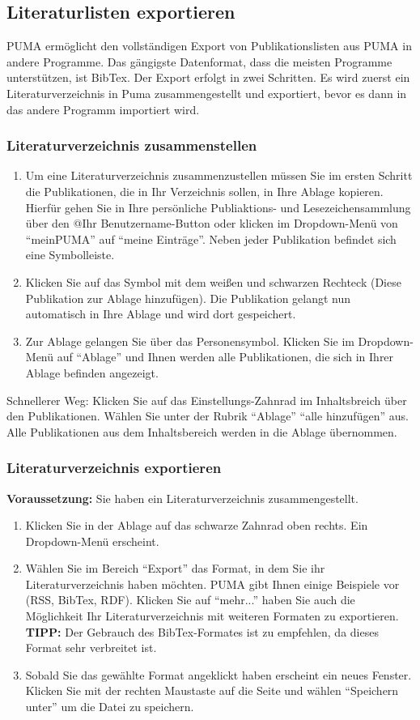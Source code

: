 \documentclass[b5paper,11pt,twoside]{scrbook} %
\begin{document}
\subsection{Literaturlisten exportieren}
PUMA ermöglicht den vollständigen Export von Publikationslisten aus PUMA in andere Programme. Das gängigste Datenformat, dass die meisten Programme unterstützen, ist BibTex. \newline 
Der Export erfolgt in zwei Schritten. Es wird zuerst ein Literaturverzeichnis in Puma zusammengestellt und exportiert, bevor es dann in das andere Programm importiert wird.
\subsubsection{Literaturverzeichnis zusammenstellen}
\begin{enumerate}
    \item Um eine Literaturverzeichnis zusammenzustellen müssen Sie im ersten Schritt die Publikationen, die in Ihr Verzeichnis sollen, in Ihre Ablage kopieren. Hierfür gehen Sie in Ihre persönliche Publiaktions- und Lesezeichensammlung über den @Ihr Benutzername-Button oder klicken im Dropdown-Menü von \enquote{meinPUMA} auf \enquote{meine Einträge}.  Neben jeder Publikation befindet sich eine Symbolleiste.
    \item Klicken Sie auf das Symbol mit dem weißen und schwarzen Rechteck (Diese Publikation zur Ablage hinzufügen). Die Publikation gelangt nun automatisch in Ihre Ablage und wird dort gespeichert.
    \item Zur Ablage gelangen Sie über das Personensymbol. Klicken Sie im Dropdown-Menü auf \enquote{Ablage} und Ihnen werden alle Publikationen, die sich in Ihrer Ablage befinden angezeigt. 
\end{enumerate}
Schnellerer Weg: Klicken Sie auf das Einstellungs-Zahnrad im Inhaltsbreich über den Publikationen. Wählen Sie unter der Rubrik \enquote{Ablage} \enquote{alle hinzufügen} aus. Alle Publikationen aus dem Inhaltsbereich werden in die Ablage übernommen. 
\subsubsection{Literaturverzeichnis exportieren}
\textbf{Voraussetzung:} Sie haben ein Literaturverzeichnis zusammengestellt.
\begin{enumerate}
    \item Klicken Sie in der Ablage auf das schwarze Zahnrad oben rechts. Ein Dropdown-Menü erscheint.
    \item Wählen Sie im Bereich \enquote{Export} das Format, in dem Sie ihr Literaturverzeichnis haben möchten. PUMA gibt Ihnen einige Beispiele vor (RSS, BibTex, RDF). Klicken Sie auf \enquote{mehr...} haben Sie auch die Möglichkeit Ihr Literaturverzeichnis mit weiteren Formaten zu exportieren. \textbf{TIPP:} Der Gebrauch des BibTex-Formates ist zu empfehlen, da dieses Format sehr verbreitet ist.
    \item Sobald Sie das gewählte Format angeklickt haben erscheint ein neues Fenster. Klicken Sie mit der rechten Maustaste auf die Seite und wählen \enquote{Speichern unter} um die Datei zu speichern.
\end{enumerate}
\end{document}
